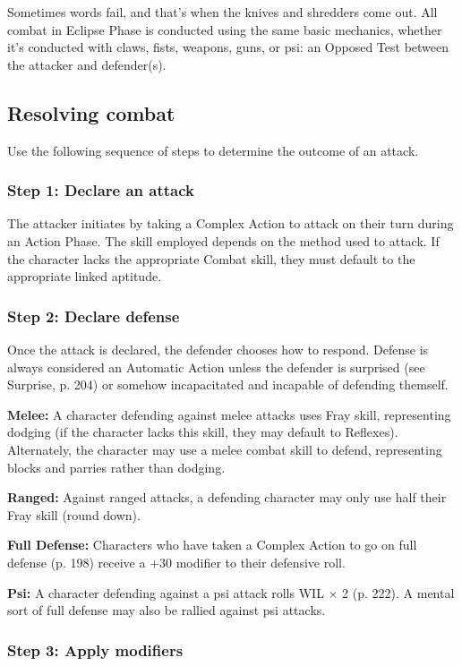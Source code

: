 Sometimes words fail, and that’s when the knives and shredders come out. All combat in Eclipse Phase is conducted using the same basic mechanics, whether it’s conducted with claws, fists, weapons, guns, or psi: an Opposed Test between the attacker and defender(s).

\subsection{Resolving combat}

Use the following sequence of steps to determine the outcome of an attack.

\subsubsection{Step 1: Declare an attack}

The attacker initiates by taking a Complex Action to attack on their turn during an Action Phase. The skill employed depends on the method used to attack. If the character lacks the appropriate Combat skill, they must default to the appropriate linked aptitude.

\subsubsection{Step 2: Declare defense}

Once the attack is declared, the defender chooses how to respond. Defense is always considered an Automatic Action unless the defender is surprised (see Surprise, p. 204) or somehow incapacitated and incapable of defending themself.

\textbf{Melee:} A character defending against melee attacks uses Fray skill, representing dodging (if the character lacks this skill, they may default to Reflexes). Alternately, the character may use a melee combat skill to defend, representing blocks and parries rather than dodging.

\textbf{Ranged:} Against ranged attacks, a defending character may only use half their Fray skill (round down).

\textbf{Full Defense:} Characters who have taken a Complex Action to go on full defense (p. 198) receive a +30 modifier to their defensive roll.

\textbf{Psi:} A character defending against a psi attack rolls WIL $\times$ 2 (p. 222). A mental sort of full defense may also be rallied against psi attacks.

\subsubsection{Step 3: Apply modifiers}

